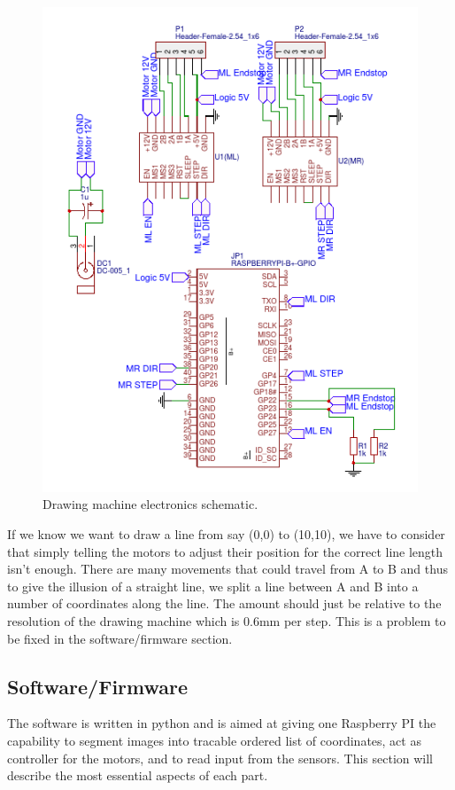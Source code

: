 \begin{figure}[h]
\centering
\includegraphics[scale=0.60]{Images/DrawingMachine/Schematic.png}
\caption{ Drawing machine electronics schematic. }
\label{DrawingMachineSchematic}
\end{figure}
 
If we know we want to draw a line from say (0,0) to (10,10), we have to consider that simply telling the motors to adjust their position for the correct line length isn't enough. There are many movements that could travel from A to B and thus to give the illusion of a straight line, we split a line between A and B into a number of coordinates along the line. The amount should just be relative to the resolution of the drawing machine which is 0.6mm per step. This is a problem to be fixed in the software/firmware section.

\subsection{Software/Firmware}
The software is written in python and is aimed at giving one Raspberry PI the capability to segment images into tracable ordered list of coordinates, act as controller for the motors, and to read input from the sensors. This section will describe the most essential aspects of each part.
\\\\
